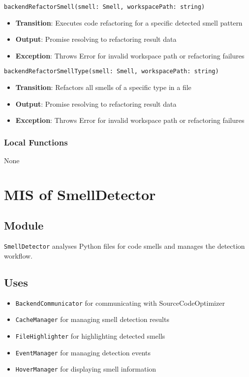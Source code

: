 \documentclass[12pt, titlepage]{article}
\begin{document}
\noindent\texttt{backendRefactorSmell(smell: Smell, workspacePath: string)}
\begin{itemize}
    \item \textbf{Transition}: Executes code refactoring for a specific detected smell pattern
    \item \textbf{Output}: Promise resolving to refactoring result data
    \item \textbf{Exception}: Throws Error for invalid workspace path or refactoring failures
\end{itemize}

\noindent\texttt{backendRefactorSmellType(smell: Smell, workspacePath: string)}
\begin{itemize}
    \item \textbf{Transition}: Refactors all smells of a specific type in a file
    \item \textbf{Output}: Promise resolving to refactoring result data
    \item \textbf{Exception}: Throws Error for invalid workspace path or refactoring failures
\end{itemize}

\subsubsection{Local Functions}
None

\section{MIS of SmellDetector}

\subsection{Module}
\texttt{SmellDetector} analyses Python files for code smells and manages the detection workflow.

\subsection{Uses}
\begin{itemize}
\item \texttt{BackendCommunicator} for communicating with SourceCodeOptimizer
\item \texttt{CacheManager} for managing smell detection results
\item \texttt{FileHighlighter} for highlighting detected smells
\item \texttt{EventManager} for managing detection events
\item \texttt{HoverManager} for displaying smell information
\end{itemize}
\end{document}

